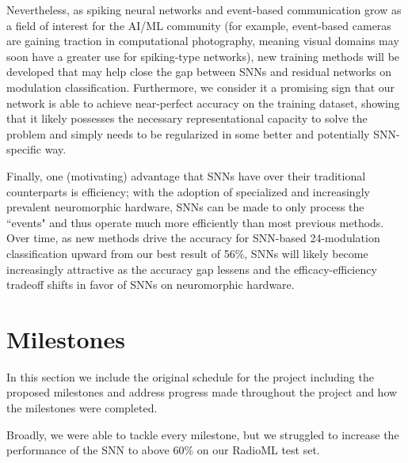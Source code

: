 \documentclass[parskip=true, 10pt]{scrartcl}
\begin{document}
Nevertheless, as spiking neural networks and event-based communication grow as a field of interest for the AI/ML community (for example, event-based cameras are gaining traction in computational photography, meaning visual domains may soon have a greater use for spiking-type networks), new training methods will be developed that may help close the gap between SNNs and residual networks on modulation classification. Furthermore, we consider it a promising sign that our network is able to achieve near-perfect accuracy on the training dataset, showing that it likely possesses the necessary representational capacity to solve the problem and simply needs to be regularized in some better and potentially SNN-specific way.

Finally, one (motivating) advantage that SNNs have over their traditional counterparts is efficiency; with the adoption of specialized and increasingly prevalent neuromorphic hardware, SNNs can be made to only process the ``events" and thus operate much more efficiently than most previous methods. Over time, as new methods drive the accuracy for SNN-based 24-modulation classification upward from our best result of 56\%, SNNs will likely become increasingly attractive as the accuracy gap lessens and the efficacy-efficiency tradeoff shifts in favor of SNNs on neuromorphic hardware.
\newpage
\section{Milestones}

In this section we include the original schedule for the project including the proposed milestones and address progress made throughout the project and how the milestones were completed.

Broadly, we were able to tackle every milestone, but we struggled to increase the performance of the SNN to above 60\% on our RadioML test set.

\label{sec:schedule}
\renewcommand{\arraystretch}{1.5}
\end{document}
